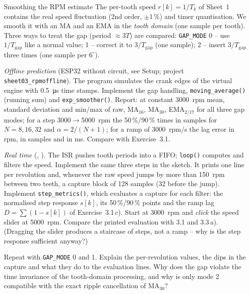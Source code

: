 \begin{exercise}{Smoothing the RPM estimate}{\Wokwi}
The per-tooth speed $r[k]=1/T_k$ of Sheet~1 contains the real speed fluctuation
(2nd order, $\pm1\,\%$) and timer quantisation. We smooth it with an MA and an EMA
in the \emph{tooth domain} (one sample per tooth). Three ways to treat the gap
(period $\approx3T$) are compared:
\texttt{GAP\_MODE} 0 -- use $1/T_{\text{gap}}$ like a normal value;
1 -- correct it to $3/T_{\text{gap}}$ (one sample);
2 -- insert $3/T_{\text{gap}}$ three times (one sample per $6^\circ$).
\begin{tasks}
  \item \emph{Offline prediction} (ESP32 without circuit, see Setup;
    project \texttt{sheet03\_rpmoffline}). The program simulates the
    crank edges of the virtual engine with \SI{0.5}{\micro s} time stamps.
    Implement the gap handling, \texttt{moving\_average()} (running sum) and
    \texttt{exp\_smoother()}. Report: at constant \SI{3000}{rpm} mean, standard
    deviation and min/max of raw, MA$_{16}$, MA$_{30}$, EMA$_{2/17}$ for all
    three gap modes; for a step 3000$\to$\SI{5000}{rpm} the 50\,\%/90\,\% times in
    samples for $N=8,16,32$ and $\alpha=2/(N+1)$; for a ramp of
    \SI{3000}{rpm/s} the lag error in rpm, in samples and in ms.
    Compare with Exercise~3.1.
  \item \emph{Real time} (\Wokwi, ). The ISR
    pushes tooth periods into a FIFO; \texttt{loop()} computes and filters the
    speed. Implement the same three steps in the sketch. It prints one line per
    revolution and, whenever the raw speed jumps by more than \SI{150}{rpm} between
    two teeth, a capture block of 128 samples (32 before the jump). Implement
    \texttt{step\_metrics()}, which evaluates a capture for each filter: the
    normalised step response $s[k]$, its 50\,\%/90\,\% points and the ramp lag
    $D=\sum(1-s[k])$ of Exercise~3.1\,c). Start at \SI{3000}{rpm} and
    \emph{click} the speed slider at \SI{5000}{rpm}. Compare the printed
    evaluation with 3.1 and 3.3\,a). (Dragging the slider produces a staircase
    of steps, not a ramp -- why is the step response sufficient anyway?)
  \item Repeat with \texttt{GAP\_MODE} 0 and 1. Explain the per-revolution values,
    the dips in the capture and what they do to the evaluation lines. Why does
    the gap violate the time invariance of the tooth-domain processing, and why
    is only mode 2 compatible with the exact ripple cancellation of MA$_{30}$?

\end{tasks}
\end{exercise}

